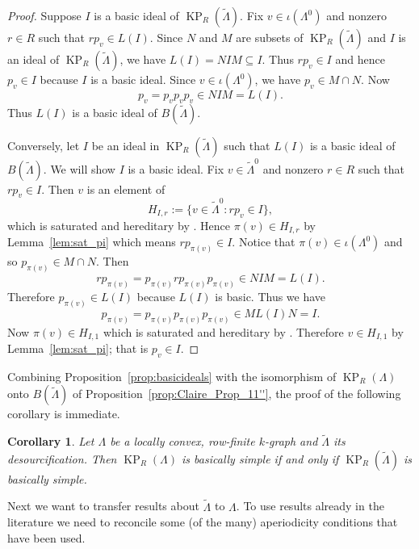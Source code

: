 \documentclass[a4paper,12pt]{amsart}
\numberwithin{equation}{section}
\newtheorem{cor}[thm]{Corollary}
\theoremstyle{definition}
\theoremstyle{remark}
\begin{document}
\begin{proof} 
Suppose $I$ is a  basic ideal of
$\operatorname{KP}_R({\tilde{\Lambda}})$.   Fix $v \in \iota(\Lambda^0)$ and nonzero $r \in R$ such that $rp_v \in L(I)$.
Since
$N$ and $M$ are subsets of $\operatorname{KP}_R({\tilde{\Lambda}})$ and $I$ is an ideal of $\operatorname{KP}_R({\tilde{\Lambda}})$, we have $L(I)=NIM \subseteq I$.  Thus
$rp_v \in I$ and hence $p_v \in I$ because $I$ is a basic ideal.
Since $v \in \iota(\Lambda^0)$, we have  $p_v \in M \cap N$.  Now
\[
 p_v=p_vp_vp_v \in NIM = L(I).
\]
Thus $L(I)$ is a basic ideal of $B({\tilde{\Lambda}})$. 

Conversely, let $I$ be an ideal in $\operatorname{KP}_R({\tilde{\Lambda}})$ such that  $L(I)$ is a basic ideal of $B({\tilde{\Lambda}})$.  We will
show $I$ is a basic ideal.
Fix $v \in {\tilde{\Lambda}}^0$ and nonzero $r \in R$ such that $rp_v \in I$.
  Then $v$ is an element of 
\[H_{I,r} := \{v \in {\tilde{\Lambda}}^0 : rp_v \in I\},\]
which is saturated and hereditary by \cite[Lemma~5.2]{ACaHR}.  Hence $\pi(v) \in H_{I,r}$ by Lemma~\ref{lem:sat_pi} which means $rp_{\pi(v)} \in I$.
Notice that $\pi(v) \in \iota(\Lambda^0)$ and so $p_{\pi(v)} \in M \cap N$.   Then
\[rp_{\pi(v)} = p_{\pi(v)}rp_{\pi(v)}p_{\pi(v)} \in NIM = L(I).
\]
Therefore $p_{\pi(v)} \in L(I)$ because $L(I)$ is basic.
Thus we have \[p_{\pi(v)} = p_{\pi(v)}p_{\pi(v)}p_{\pi(v)}  \in ML(I)N = I.\]
Now  $\pi(v) \in H_{I,1}$ which is  saturated and hereditary by \cite[Lemma~5.2]{ACaHR}.
Therefore $v \in H_{I,1}$ by Lemma~\ref{lem:sat_pi}; that is $p_v \in I$.
\end{proof}

Combining Proposition~\ref{prop:basicideals} with the isomorphism of
$\operatorname{KP}_R(\Lambda)$ onto
$B({\tilde{\Lambda}})$ of Proposition~\ref{prop:Claire_Prop_11''}, the
proof of the following corollary is immediate.

\begin{cor}
\label{cor:basicsimple}
Let $\Lambda$ be a locally convex, row-finite $k$-graph and ${\tilde{\Lambda}}$ its 
desourcification.  Then $\operatorname{KP}_R(\Lambda)$ is basically simple if and only
if $\operatorname{KP}_R({\tilde{\Lambda}})$ is basically simple.
\end{cor}

Next we want to transfer results about ${\tilde{\Lambda}}$ to $\Lambda$.  To use results 
already in the literature we need to reconcile some (of the many) aperiodicity conditions that have been used.
\end{document}
